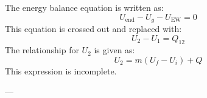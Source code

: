 The energy balance equation is written as:  
\[
U_{\text{end}} - U_g - U_{\text{EW}} = 0
\]  
This equation is crossed out and replaced with:  
\[
U_2 - U_1 = Q_{12}
\]  
The relationship for \( U_2 \) is given as:  
\[
U_2 = m(U_f - U_i) + Q
\]  
This expression is incomplete.  

---